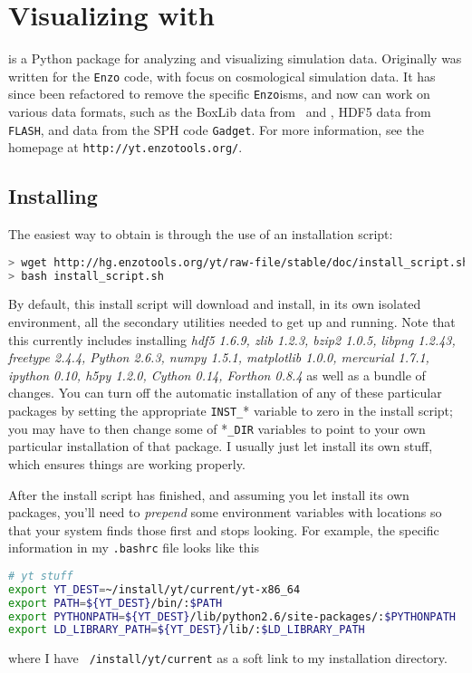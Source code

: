 \section{Visualizing with \yt}
\yt is a Python package for analyzing and visualizing simulation data.
Originally \yt was written for the {\tt Enzo} code, with focus on
cosmological simulation data.  It has since been refactored to remove
the specific {\tt Enzo}isms, and now can work on various data formats,
such as the BoxLib data from \maestro\ and \castro, HDF5 data
from {\tt FLASH}, and data from the SPH code {\tt Gadget}.  For more
information, see the \yt homepage at {\tt http://yt.enzotools.org/}.

\subsection{Installing \yt}
The easiest way to obtain \yt is through the use of an installation script:
\begin{lstlisting}[language=bash,mathescape=false]
> wget http://hg.enzotools.org/yt/raw-file/stable/doc/install_script.sh
> bash install_script.sh
\end{lstlisting}
By default, this \yt install script will download and install, in its
own isolated environment, all the secondary utilities needed to get \yt
up and running.  Note that this currently includes installing {\it
  hdf5 1.6.9, zlib 1.2.3, bzip2 1.0.5, libpng 1.2.43, freetype 2.4.4,
  Python 2.6.3, numpy 1.5.1, matplotlib 1.0.0, mercurial 1.7.1,
  ipython 0.10, h5py 1.2.0, Cython 0.14, Forthon 0.8.4} as well as a
 bundle of changes.  You can turn off the automatic
installation of any of these particular packages by setting the
appropriate {\tt INST\_}* variable to zero in the install script;
you may have to then change some of *{\tt \_DIR} variables to point to
your own particular installation of that package.  I usually just let
\yt install its own stuff, which ensures things are working properly.

After the install script has finished, and assuming you let \yt install its own packages, you'll need to {\it prepend} some environment variables with \yt locations so that your system finds those first and stops looking.  For example, the \yt specific information in my {\tt .bashrc} file looks like this
\begin{lstlisting}[language=bash,mathescape=false]
# yt stuff
export YT_DEST=~/install/yt/current/yt-x86_64
export PATH=${YT_DEST}/bin/:$PATH
export PYTHONPATH=${YT_DEST}/lib/python2.6/site-packages/:$PYTHONPATH
export LD_LIBRARY_PATH=${YT_DEST}/lib/:$LD_LIBRARY_PATH
\end{lstlisting}
where I have {\tt ~/install/yt/current} as a soft link to my \yt
installation directory.

